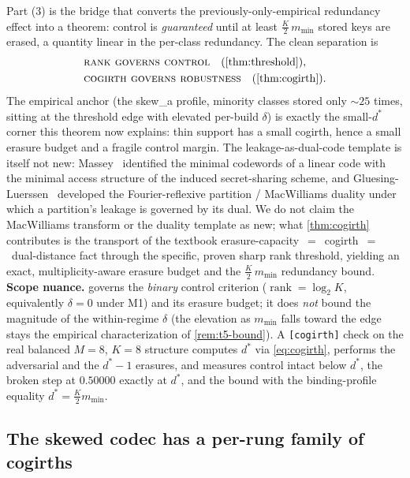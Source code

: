 \documentclass[sigconf,nonacm,anonymous,balance=false]{acmart}
\DeclareMathOperator{\rank}{rank}
\begin{document}
Part (3) is the bridge that converts the previously-only-empirical redundancy effect into
a theorem: control is \emph{guaranteed} until at least $\tfrac{K}{2}\,m_{\min}$ stored keys
are erased, a quantity linear in the per-class redundancy. The clean separation is
\[
  \begin{aligned}
    &\textsc{rank governs control} \quad\text{(\cref{thm:threshold})},\\
    &\textsc{cogirth governs robustness} \quad\text{(\cref{thm:cogirth})}.
  \end{aligned}
\]
The empirical anchor (the skew\_a profile, minority classes stored only $\sim 25$ times,
sitting at the threshold edge with elevated per-build $\delta$) is exactly the small-$d^\ast$
corner this theorem now explains: thin support has a small cogirth, hence a small erasure
budget and a fragile control margin. The leakage-as-dual-code template is itself not new:
Massey~\cite{massey1993minimal} identified the minimal codewords of a linear code with the
minimal access structure of the induced secret-sharing scheme, and
Gluesing-Luerssen~\cite{gluesingluerssen2014fourier} developed the Fourier-reflexive
partition / MacWilliams duality under which a partition's leakage is governed by its dual.
We do not claim the MacWilliams transform or the duality template as new; what
\cref{thm:cogirth} contributes is the transport of the textbook
erasure-capacity~$=$~cogirth~$=$~dual-distance fact through the specific, proven sharp rank
threshold, yielding an exact, multiplicity-aware erasure budget and the
$\tfrac{K}{2}\,m_{\min}$ redundancy bound. \textbf{Scope nuance.}  governs
the \emph{binary} control criterion ($\rank = \log_2 K$, equivalently $\delta = 0$ under
M1) and its erasure budget; it does \emph{not} bound the magnitude of the within-regime
$\delta$ (the elevation as $m_{\min}$ falls toward the edge stays the empirical
characterization of \cref{rem:t5-bound}). A \texttt{[cogirth]} check on the real balanced
$M = 8$, $K = 8$ structure computes $d^\ast$ via \eqref{eq:cogirth}, performs the
adversarial and the $d^\ast - 1$ erasures, and measures control intact below $d^\ast$, the
broken step at $0.50000$ exactly at $d^\ast$, and the bound with the binding-profile
equality $d^\ast = \tfrac{K}{2}m_{\min}$.

\subsection{The skewed codec has a per-rung family of cogirths}
\label{sec:t5c}
\end{document}
